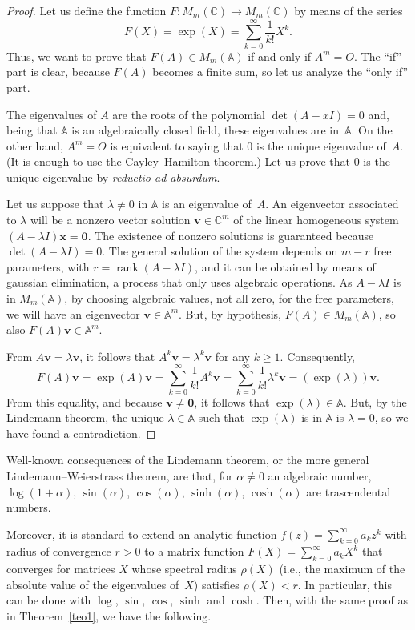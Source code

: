\documentclass[11pt,a4paper]{article}
\newcommand{\C}{\mathbb{C}}
\newcommand{\A}{\mathbb{A}}
\begin{document}
\begin{proof}
Let us define the function $F:M_{m}(\C) \to M_m(\C)$ by means of the series
\[
F(X) = \exp(X) = \sum_{k=0}^{\infty} \frac{1}{k!}X^{k}.
\]
Thus, we want to prove that $F(A) \in M_{m}(\A)$ if and only if $A^m=O$.
The ``if'' part is clear, because $F(A)$ becomes a finite sum, so let us analyze the ``only if'' part.

The eigenvalues of $A$ are the roots of the polynomial $\det(A-xI)=0$ and, being that $\A$ is an algebraically closed field, these eigenvalues are in~$\A$. On the other hand, $A^m=O$ is equivalent to saying that $0$ is the unique eigenvalue of~$A$. (It is enough to use the Cayley--Hamilton theorem.) Let us prove that $0$ is the unique eigenvalue by \emph{reductio ad absurdum}.

Let us suppose that $\lambda \ne 0$ in $\A$ is an eigenvalue of~$A$. An eigenvector associated to $\lambda$ will be  a nonzero vector solution $\mathbf{v} \in \C^m$ of the linear homogeneous system $(A-\lambda I) \mathbf{x} = \mathbf{0}$.
The existence of nonzero solutions is guaranteed because $\det(A-\lambda I)=0$.
The general solution of the system depends on $m-r$ free parameters, with $r = \operatorname{rank}(A-\lambda I)$, and it can be obtained by means of gaussian elimination, a process that only uses algebraic operations. As $A-\lambda I$ is in $M_m(\A)$, by choosing algebraic values, not all zero, for the free parameters, we will have an eigenvector $\mathbf{v} \in \A^m$. But, by hypothesis, $F(A) \in M_m(\A)$, so also $F(A) \mathbf{v} \in \A^m$.

From $A\mathbf{v}=\lambda \mathbf{v}$, it follows that $A^k \mathbf{v} = \lambda^k \mathbf{v}$ for any $k\geq 1$. Consequently,
\[
F(A)\mathbf{v} = \exp(A)\mathbf{v} = \sum_{k=0}^{\infty} \frac{1}{k!}A^{k}\mathbf{v}
= \sum_{k=0}^{\infty} \frac{1}{k!}\lambda^{k}\mathbf{v}
= (\exp(\lambda)) \mathbf{v}.
\]
From this equality, and because $\mathbf{v} \neq \mathbf{0}$, it follows that $\exp(\lambda) \in \A$. 
But, by the Lindemann theorem, the unique $\lambda \in \A$ such that $\exp(\lambda)$ is in $\A$ is $\lambda=0$, so we have found a contradiction.
\end{proof}

Well-known consequences of the Lindemann theorem, or the more general Lindemann--Weierstrass theorem, are that, for $\alpha \ne 0$ an algebraic number, $\log(1+\alpha)$, $\sin(\alpha)$, $\cos(\alpha)$, $\sinh(\alpha)$, $\cosh(\alpha)$ are trascendental numbers.

Moreover, it is standard to extend an analytic function $f(z) = \sum_{k=0}^{\infty} a_kz^k$ with radius of convergence $r>0$ to a matrix function $F(X) = \sum_{k=0}^{\infty} a_k X^k$ that converges for matrices $X$ whose spectral radius $\rho(X)$ (i.e., the maximum of the absolute value of the eigenvalues of~$X$) satisfies $\rho(X) < r$. In particular, this can be done with $\log$, $\sin$, $\cos$, $\sinh$ and $\cosh$. Then, with the same proof as in Theorem~\ref{teo1}, we have the following.
\end{document}
